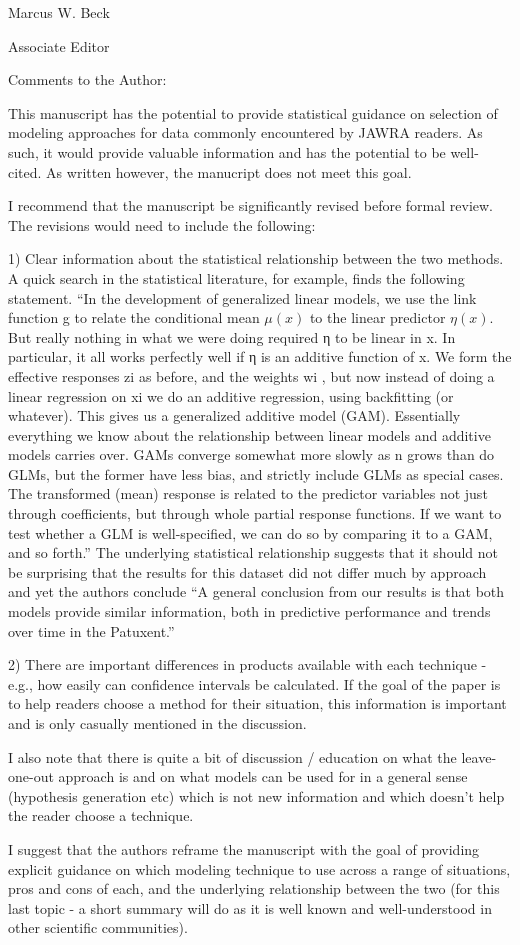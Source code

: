 \documentclass[a4paper,12pt]{article}
\begin{document}
\hspace{4.5in}Marcus W. Beck
\clearpage

Associate Editor

Comments to the Author:

This manuscript has the potential to provide statistical guidance on selection of modeling approaches for data commonly encountered by JAWRA readers.  As such, it would provide valuable information and has the potential to be well-cited.  As written however, the manucript does not meet this goal.

I recommend that the manuscript be significantly revised before formal review.  The revisions would need to include the following:

1) Clear information about the statistical relationship between the two methods.  A quick search in the statistical literature, for example, finds the following statement. ``In the development of generalized linear models, we use the link function g to relate the conditional mean $\mu\left(x\right)$ to the linear predictor $\eta\left(x\right)$. But really nothing in what we were doing required η to be linear in x. In particular, it all works perfectly well if η is an additive function of x. We form the effective responses zi as before, and the weights wi , but now instead of doing a linear regression on xi we do an additive regression, using backfitting (or whatever). This gives us a generalized additive model (GAM). Essentially everything we know about the relationship between linear models and additive models carries over. GAMs converge somewhat more slowly as n grows than do GLMs, but the former have less bias, and strictly include GLMs as special cases. The transformed (mean) response is related to the predictor variables not just through coefficients, but through whole partial response functions. If we want to test whether a GLM is well-specified, we can do so by comparing it to a GAM, and so forth.''
The underlying statistical relationship suggests that it should not be surprising that the results for this dataset did not differ much by approach and yet the authors conclude ``A general conclusion from our results is that both models provide similar information, both in predictive performance and trends over time in the Patuxent.''

2) There are important differences in products available with each technique - e.g., how easily can confidence intervals be calculated.  If the goal of the paper is to help readers choose a method for their situation, this information is important and is only casually mentioned in the discussion.

I also note that there is quite a bit of discussion / education on what the leave-one-out approach is and on what models can be used for in a general sense (hypothesis generation etc) which is not new information and which doesn't help the reader choose a technique.

I suggest that the authors reframe the manuscript with the goal of providing explicit guidance on which modeling technique to use across a range of situations, pros and cons of each, and the underlying relationship between the two (for this last topic - a short summary will do as it is well known and well-understood in other scientific communities).
\end{document}
